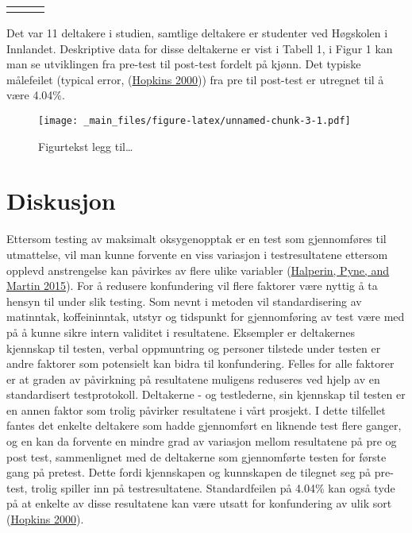 \documentclass[
]{book}
\begin{document}
\begin{longtable}[c]{|p{1.08in}|p{1.02in}|p{1.02in}}
\noalign{\global\setlength{\arrayrulewidth}{2pt}}\arrayrulecolor[HTML]{666666}\cline{1-3}



\end{longtable}

Det var 11 deltakere i studien, samtlige deltakere er studenter ved
Høgskolen i Innlandet. Deskriptive data for disse deltakerne er vist i
Tabell 1, i Figur 1 kan man se utviklingen fra pre-test til post-test
fordelt på kjønn. Det typiske målefeilet (typical error,
(\protect\hyperlink{ref-hopkins2000}{Hopkins 2000})) fra pre til
post-test er utregnet til å være 4.04\%.

\begin{figure}
\centering
\texttt{[image: \_main\_files/figure-latex/unnamed-chunk-3-1.pdf]}
\caption{Figurtekst legg til\ldots{}}
\end{figure}

\hypertarget{diskusjon}{%
\section{Diskusjon}\label{diskusjon}}

Ettersom testing av maksimalt oksygenopptak er en test som gjennomføres
til utmattelse, vil man kunne forvente en viss variasjon i
testresultatene ettersom opplevd anstrengelse kan påvirkes av flere
ulike variabler (\protect\hyperlink{ref-halperin2015}{Halperin, Pyne,
and Martin 2015}). For å redusere konfundering vil flere faktorer være
nyttig å ta hensyn til under slik testing. Som nevnt i metoden vil
standardisering av matinntak, koffeininntak, utstyr og tidspunkt for
gjennomføring av test være med på å kunne sikre intern validitet i
resultatene. Eksempler er deltakernes kjennskap til testen, verbal
oppmuntring og personer tilstede under testen er andre faktorer som
potensielt kan bidra til konfundering. Felles for alle faktorer er at
graden av påvirkning på resultatene muligens reduseres ved hjelp av en
standardisert testprotokoll. Deltakerne - og testlederne, sin kjennskap
til testen er en annen faktor som trolig påvirker resultatene i vårt
prosjekt. I dette tilfellet fantes det enkelte deltakere som hadde
gjennomført en liknende test flere ganger, og en kan da forvente en
mindre grad av variasjon mellom resultatene på pre og post test,
sammenlignet med de deltakerne som gjennomførte testen for første gang
på pretest. Dette fordi kjennskapen og kunnskapen de tilegnet seg på
pre-test, trolig spiller inn på testresultatene. Standardfeilen på
4.04\% kan også tyde på at enkelte av disse resultatene kan være utsatt
for konfundering av ulik sort
(\protect\hyperlink{ref-hopkins2000}{Hopkins 2000}).
\end{document}
